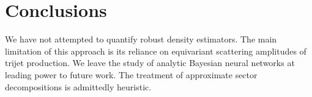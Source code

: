 \section{Conclusions}\label{sec:conclusions}

We have not attempted to quantify robust density estimators. The main
limitation of this approach is its reliance on equivariant scattering
amplitudes of trijet production. We leave the study of analytic Bayesian
neural networks at leading power to future work. The treatment of
approximate sector decompositions is admittedly heuristic.

